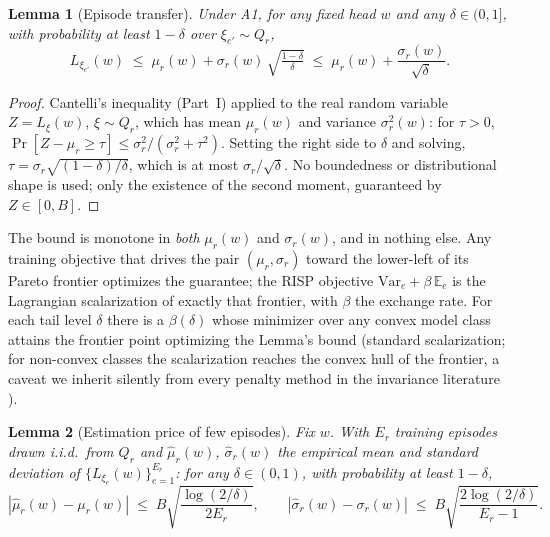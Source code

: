\documentclass[11pt,a4paper]{article}
\theoremstyle{definition}
\theoremstyle{plain}
\newtheorem{lemma}{Lemma}[section]
\newcommand{\E}{\mathbb{E}}
\newcommand{\Var}{\mathrm{Var}}
\newcommand{\nm}{\textsc{RISP}}
\begin{document}
\begin{lemma}[Episode transfer]
\label{lem:dd4-transfer}
Under A1, for any fixed head $w$ and any $\delta \in (0, 1]$, with
probability at least $1 - \delta$ over $\xi_{e'} \sim Q_r$,
\[
  L_{\xi_{e'}}(w) \;\le\; \mu_r(w) +
  \sigma_r(w)\,\sqrt{\tfrac{1-\delta}{\delta}}
  \;\le\; \mu_r(w) + \frac{\sigma_r(w)}{\sqrt{\delta}} .
\]
\end{lemma}

\begin{proof}
Cantelli's inequality (Part~I) applied to the real random variable
$Z = L_\xi(w)$, $\xi \sim Q_r$, which has mean $\mu_r(w)$ and variance
$\sigma_r^2(w)$: for $\tau > 0$,
$\Pr[Z - \mu_r \ge \tau] \le \sigma_r^2 / (\sigma_r^2 + \tau^2)$.
Setting the right side to $\delta$ and solving,
$\tau = \sigma_r \sqrt{(1-\delta)/\delta}$, which is at most
$\sigma_r / \sqrt{\delta}$. No boundedness or distributional shape is
used; only the existence of the second moment, guaranteed by
$Z \in [0, B]$.
\end{proof}

\begin{keypoint}
The bound is monotone in \emph{both} $\mu_r(w)$ and $\sigma_r(w)$, and in
nothing else. Any training objective that drives the pair
$(\mu_r, \sigma_r)$ toward the lower-left of its Pareto frontier
optimizes the guarantee; the \nm{} objective
$\Var_e + \beta\,\E_e$ is the Lagrangian scalarization of exactly that
frontier, with $\beta$ the exchange rate. For each tail level $\delta$
there is a $\beta(\delta)$ whose minimizer over any convex model class
attains the frontier point optimizing the Lemma's bound (standard
scalarization; for non-convex classes the scalarization reaches the
convex hull of the frontier, a caveat we inherit silently from every
penalty method in the invariance literature \cite{krueger2021rex}).
\end{keypoint}

\begin{lemma}[Estimation price of few episodes]
\label{lem:dd4-estimation}
Fix $w$. With $E_r$ training episodes drawn i.i.d.\ from $Q_r$ and
$\hat\mu_r(w)$, $\hat\sigma_r(w)$ the empirical mean and standard
deviation of $\{L_{\xi_e}(w)\}_{e=1}^{E_r}$: for any
$\delta \in (0, 1)$, with probability at least $1 - \delta$,
\[
  |\hat\mu_r(w) - \mu_r(w)| \;\le\; B \sqrt{\frac{\log(2/\delta)}{2 E_r}},
  \qquad
  |\hat\sigma_r(w) - \sigma_r(w)| \;\le\; B \sqrt{\frac{2 \log(2/\delta)}{E_r - 1}} .
\]
\end{lemma}
\end{document}

